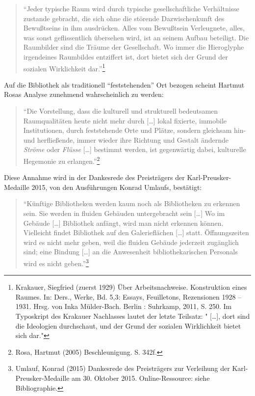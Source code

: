 \documentclass[a4paper,
fontsize=11pt,
oneside,
numbers=noperiodatend,
parskip=half-,
bibliography=totoc,
final
]{scrartcl}
\begin{document}
\begin{quote}
\enquote{Jeder typische Raum wird durch typische gesellschaftliche
Verhältnisse zustande gebracht, die sich ohne die störende
Dazwischenkunft des Bewußtseins in ihm ausdrücken. Alles vom Bewußtsein
Verleugnete, alles, was sonst geflissentlich übersehen wird, ist an
seinem Aufbau beteiligt. Die Raumbilder sind die Träume der
Gesellschaft. Wo immer die Hieroglyphe irgendeines Raumbildes entziffert
ist, dort bietet sich der Grund der sozialen Wirklichkeit
dar.}\footnote{Krakauer, Siegfried (zuerst 1929) Über Arbeitsnachweise.
  Konstruktion eines Raumes. In: Ders., Werke, Bd. 5,3: Essays,
  Feuilletons, Rezensionen 1928 -- 1931. Hrsg. von Inka Mülder-Bach.
  Berlin : Suhrkamp, 2011, S. 250. Im Typoskript des Krakauer Nachlasses
  lautet der letzte Teilsatz: " {[}\ldots{}{]}, dort sind die Ideologien
  durchschaut, und der Grund der sozialen Wirklichkeit bietet sich dar."}
\end{quote}

Auf die Bibliothek als traditionell \enquote{feststehenden} Ort bezogen
scheint Hartmut Rosas Analyse zunehmend wahrscheinlich zu werden:

\begin{quote}
\enquote{Die Vorstellung, dass die kulturell und strukturell bedeutsamen
Raumqualitäten heute nicht mehr durch {[}\ldots{}{]} lokal fixierte,
immobile Institutionen, durch feststehende Orte und Plätze, sondern
gleichsam hin- und herfließende, immer wieder ihre Richtung und Gestalt
ändernde \emph{Ströme} oder \emph{Flüsse} {[}\ldots{}{]} bestimmt
werden, ist gegenwärtig dabei, kulturelle Hegemonie zu
erlangen.}\footnote{Rosa, Hartmut (2005) Beschleunigung. S. 342f.}
\end{quote}

Diese Annahme wird in der Dankesrede des Preisträgers der
Karl-Preusker-Medaille 2015, von den Ausführungen Konrad Umlaufs,
bestätigt:

\begin{quote}
\enquote{Künftige Bibliotheken werden kaum noch als Bibliotheken zu
erkennen sein. Sie werden in fluiden Gebäuden untergebracht sein
{[}\ldots{}{]} Wo im Gebäude {[}\ldots{}{]} Bibliothek anfängt, wird man
nicht erkennen können. Vielleicht findet Bibliothek auf den
Galerieflächen {[}\ldots{}{]} statt. Öffnungszeiten wird es nicht mehr
geben, weil die fluiden Gebäude jederzeit zugänglich sind; eine Bindung
{[}\ldots{}{]} an die Anwesenheit bibliothekarischen Personals wird es
nicht geben.}\footnote{Umlauf, Konrad (2015) Dankesrede des Preisträgers
  zur Verleihung der Karl-Preusker-Medaille am 30. Oktober 2015.
  Online-Ressource: siehe Bibliographie.}
\end{quote}
\end{document}
